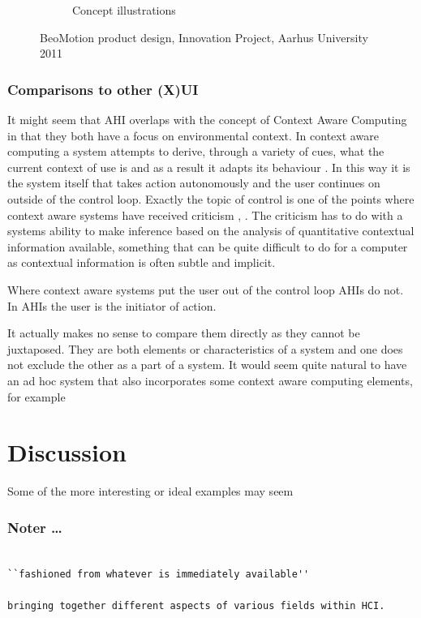 \begin{figure}
\begin{subfigure}{.54\textwidth}
		\caption{Concept illustrations}
	\end{subfigure}
	\caption{BeoMotion product design, Innovation Project, Aarhus University 2011}
	\label{fig:ch:adhoc:beomotion}
\end{figure}

\subsubsection{Comparisons to other (X)UI} 
It might seem that AHI overlaps with the concept of Context Aware Computing in that they both have a focus on environmental context.
In context aware computing a system attempts to derive, through a variety of cues, what the current context of use is and as a result it adapts its behaviour \citep[chap. 8]{krumm2009ubiquitous}. 
In this way it is the system itself that takes action autonomously and the user continues on outside of the control loop. 
Exactly the topic of control is one of the points where context aware systems have received criticism \cite{erickson2002some}, \citep[chap. 8]{krumm2009ubiquitous}.
The criticism has to do with a systems ability to make inference based on the analysis of quantitative contextual information available, something that can be quite difficult to do for a computer as contextual information is often subtle and implicit.

Where context aware systems put the user out of the control loop AHIs do not.
In AHIs the user is the initiator of action.

It actually makes no sense to compare them directly as they cannot be juxtaposed.
They are both elements or characteristics of a system and one does not exclude the other as a part of a system.
It would seem quite natural to have an ad hoc system that also incorporates some context aware computing elements, for example  
\blank
{}
\blank
{}  
\blank

\section{Discussion}

Some of the more interesting or ideal examples may seem 

\subsubsection{Noter \dots  } 
\begin{verbatim}

``fashioned from whatever is immediately available''

bringing together different aspects of various fields within HCI.

\end{verbatim} 
